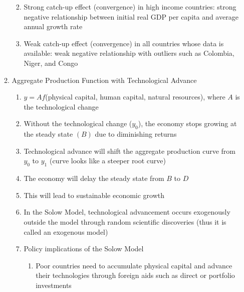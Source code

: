 \documentclass[12pt]{article}
\begin{document}
\begin{enumerate}
\begin{enumerate}
\begin{enumerate}
\begin{enumerate}
\begin{itemize}
                    \end{itemize}

                \end{enumerate}

              \item Strong catch-up effect (convergence) in high income countries: strong negative relationship between initial real GDP per capita and average annual growth rate

              \item Weak catch-up effect (convergence) in all countries whose data is available: weak negative relationship with outliers such as Colombia, Niger, and Congo

            \end{enumerate}

          \item Aggregate Production Function with Technological Advance

            \begin{enumerate}

              \item $y=Af$(physical capital, human capital, natural resources), where $A$ is the technological change

              \item Without the technological change ($y_0$), the economy stops growing at the steady state $(B)$ due to diminishing returns

              \item Technological advance will shift the aggregate production curve from $y_0$ to $y_1$ (curve looks like a steeper root curve)

              \item The economy will delay the steady state from $B$ to $D$

              \item This will lead to sustainable economic growth

              \item In the Solow Model, technological advancement occurs exogenously outside the model through random scientific discoveries (thus it is called an exogenous model)

              \item Policy implications of the Solow Model

                \begin{enumerate}

                  \item Poor countries need to accumulate physical capital and advance their technologies through foreign aids such as direct or portfolio investments


\end{enumerate}
\end{enumerate}
\end{enumerate}
\end{enumerate}
\end{document}
